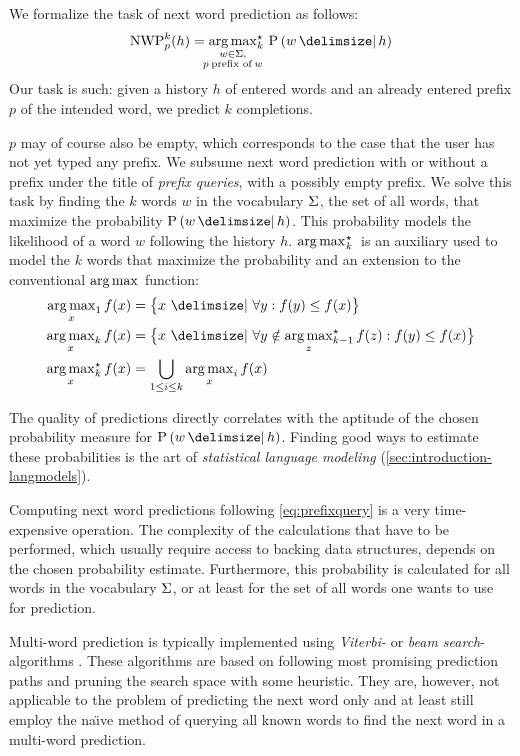 We formalize the task of next word prediction as follows:
\begin{equation}
  \label{eq:prefixquery}
  \NWP[p][k]{h} =
    \Argmax*[k]{\mathclap{\substack{w \in \Vocab,\\p \: \text{prefix of} \: w}}}
      \Prob{w}{h}
\end{equation}
Our task is such: given a history $h$ of entered words and an already entered
prefix $p$ of the intended word, we predict $k$ completions.

$p$ may of course also be empty, which corresponds to the case that
the user has not yet typed any prefix.
We subsume next word prediction with or without a prefix under the title of
\emph{prefix queries}, with a possibly empty prefix.
We solve this task by finding the $k$ words $w$ in the vocabulary $\Sigma$, the
set of all words, that maximize the probability $\Prob{w}{h}$.
This probability models the likelihood of a word $w$ following the history $h$.
$\Argmax*[k]$ is an auxiliary used to model the $k$ words that maximize the
probability and an extension to the conventional $\Argmax$ function:
\begin{subequations}
  \begin{align}
    \Argmax [1]{x} f(x) &= \big\{ x \,\Given\, \forall y : f(y) \leq f(x) \big\} \\
    \Argmax [k]{x} f(x) &= \big\{ x \,\Given\, \forall y \notin \Argmax*[k-1]{z} f(z) : f(y) \leq f(x) \big\} \\
    \Argmax*[k]{x} f(x) &= \bigcup_{{1 \leq i \leq k}} \Argmax[i]{x} f(x)
  \end{align}
\end{subequations}

The quality of predictions directly correlates with the aptitude of the chosen
probability measure for $\Prob{w}{h}$.
Finding good ways to estimate these probabilities is the art of
\emph{statistical language modeling} (\cref{sec:introduction-langmodels}).

Computing next word predictions following \cref{eq:prefixquery} is a very
time-expensive operation.
The complexity of the calculations that have to be performed, which usually
require access to backing data structures, depends on the chosen probability
estimate.
Furthermore, this probability is calculated for all words in the vocabulary
$\Sigma$, or at least for the set of all words one wants to use for prediction.

Multi-word prediction is typically implemented using \emph{Viterbi-} or
\emph{beam search}-algorithms \parencite{Bickel2005,JurafskyMartin2009}.
These algorithms are based on following most promising prediction paths and
pruning the search space with some heuristic.
They are, however, not applicable to the problem of predicting the next word
only and at least \textcite{Bickel2005} still employ the na\"{\i}ve method of
querying all known words to find the next word in a multi-word prediction.

